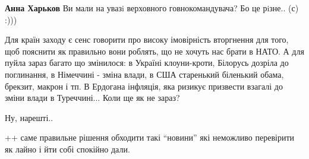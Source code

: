 \begin{itemize}
\begin{itemize} %
\textbf{Анна Харьков} Ви мали на увазi верховного говнокомандувача? Бо це рiзне.. (с) :)))
\end{itemize} %


Для країн заходу є сенс говорити про високу імовірність вторгнення для того,
щоб пояснити як правильно вони роблять, що не хочуть нас брати в НАТО. А для
пуйла зараз багато що змінилося: в Україні клоуни-кроти, Білорусь дозріла до
поглинання, в Німеччині - зміна влади, в США старенький біленький обама,
брекзит, макрон і тп. В Ердогана інфляція, яка ризикує призвести взагалі до
зміни влади в Туреччині... Коли ще як не зараз?

Ну, нарешті..


++ саме правильне рішення обходити такі \enquote{новини} які неможливо перевірити як
лайно і йти собі спокійно дали.

\end{itemize} %

